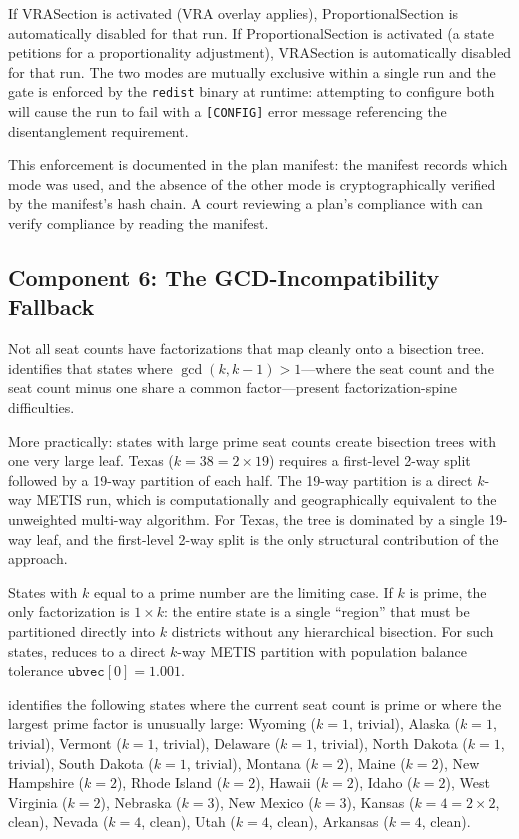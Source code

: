 If VRASection is activated (VRA overlay applies), ProportionalSection is
automatically disabled for that run.
If ProportionalSection is activated (a state petitions for a proportionality
adjustment), VRASection is automatically disabled for that run.
The two modes are mutually exclusive within a single run and the gate is enforced
by the \texttt{redist} binary at runtime: attempting to configure both will cause
the run to fail with a \texttt{[CONFIG]} error message referencing the
\callais{} disentanglement requirement.

This enforcement is documented in the plan manifest: the manifest records
which mode was used, and the absence of the other mode is cryptographically
verified by the manifest's hash chain.
A court reviewing a plan's compliance with \callais{} can verify compliance
by reading the manifest.

\subsection{Component 6: The GCD-Incompatibility Fallback}

Not all seat counts have factorizations that map cleanly onto a \hh{} bisection
tree.
\citet{b13paper} identifies that states where $\gcd(k, k-1) > 1$---where
the seat count and the seat count minus one share a common factor---present
factorization-spine difficulties.

More practically: states with large prime seat counts create bisection trees
with one very large leaf.
Texas ($k = 38 = 2 \times 19$) requires a first-level 2-way split followed
by a 19-way partition of each half.
The 19-way partition is a direct $k$-way METIS run, which is computationally
and geographically equivalent to the unweighted multi-way algorithm.
For Texas, the \hh{} tree is dominated by a single 19-way leaf, and the
first-level 2-way split is the only structural contribution of the \ar{} approach.

States with $k$ equal to a prime number are the limiting case.
If $k$ is prime, the only factorization is $1 \times k$: the entire state
is a single ``region'' that must be partitioned directly into $k$ districts
without any hierarchical bisection.
For such states, \ar{} reduces to a direct $k$-way METIS partition with
population balance tolerance $\texttt{ubvec}[0] = 1.001$.

\citet{b13paper} identifies the following states where the current seat count
is prime or where the largest prime factor is unusually large:
Wyoming ($k=1$, trivial), Alaska ($k=1$, trivial), Vermont ($k=1$, trivial),
Delaware ($k=1$, trivial), North Dakota ($k=1$, trivial), South Dakota ($k=1$,
trivial), Montana ($k=2$), Maine ($k=2$), New Hampshire ($k=2$),
Rhode Island ($k=2$), Hawaii ($k=2$), Idaho ($k=2$), West Virginia ($k=2$),
Nebraska ($k=3$), New Mexico ($k=3$), Kansas ($k=4 = 2 \times 2$, clean),
Nevada ($k=4$, clean), Utah ($k=4$, clean), Arkansas ($k=4$, clean).

